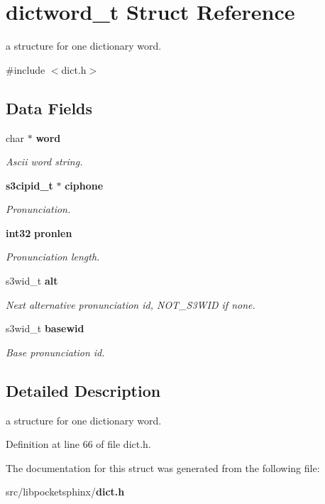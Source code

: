 \section{dictword\-\_\-t \-Struct \-Reference}
\label{structdictword__t}


a structure for one dictionary word.  




{\ttfamily \#include $<$dict.\-h$>$}

\subsection*{\-Data \-Fields}
\begin{DoxyCompactItemize}
\item 
char $\ast$ {\bf word}\label{structdictword__t_a3f3371918a406e26817bd4f2cecd7329}

\begin{DoxyCompactList}\small\item\em \-Ascii word string. \end{DoxyCompactList}\item 
{\bf s3cipid\-\_\-t} $\ast$ {\bf ciphone}\label{structdictword__t_acf5836b5a681485868e9090ad67366d5}

\begin{DoxyCompactList}\small\item\em \-Pronunciation. \end{DoxyCompactList}\item 
{\bf int32} {\bf pronlen}\label{structdictword__t_a50509f28a4b64d76519bfadea12f0fa0}

\begin{DoxyCompactList}\small\item\em \-Pronunciation length. \end{DoxyCompactList}\item 
s3wid\-\_\-t {\bf alt}\label{structdictword__t_a84b63cd03706221645f46b2da09e9540}

\begin{DoxyCompactList}\small\item\em \-Next alternative pronunciation id, \-N\-O\-T\-\_\-\-S3\-W\-I\-D if none. \end{DoxyCompactList}\item 
s3wid\-\_\-t {\bf basewid}\label{structdictword__t_a53dd72f96a9de21d8925e246cc7c036f}

\begin{DoxyCompactList}\small\item\em \-Base pronunciation id. \end{DoxyCompactList}\end{DoxyCompactItemize}


\subsection{\-Detailed \-Description}
a structure for one dictionary word. 

\-Definition at line 66 of file dict.\-h.



\-The documentation for this struct was generated from the following file\-:\begin{DoxyCompactItemize}
\item 
src/libpocketsphinx/{\bf dict.\-h}\end{DoxyCompactItemize}
